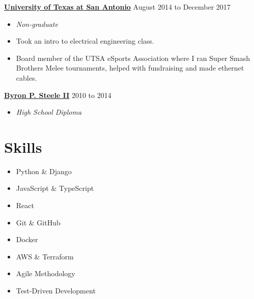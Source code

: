 \documentclass[10pt]{article}
\begin{document}
  \textbf{\href{https://www.utsa.edu/}{University of Texas at San Antonio}} \hfill {August 2014 to December 2017}
   \begin{itemize}
     \item[] \textit{Non-graduate}
     \item[] Took an intro to electrical engineering class.
     \item[] Board member of the UTSA eSports Association where I ran Super Smash Brothers Melee tournaments, helped with fundraising and made ethernet cables.
   \end{itemize}

  \textbf{\href{https://www.scuc.txed.net/ByronSteele}{Byron P. Steele II}} \hfill {2010 to 2014}
   \begin{itemize}
     \item[] \textit{High School Diploma}
   \end{itemize}

  \section*{Skills}

   \begin{multicols}{2}
   \begin{itemize}
        \item[] Python \& Django
        \item[] JavaScript \& TypeScript
        \item[] React
        \item[] Git \& GitHub
        \item[] Docker
        \item[] AWS \& Terraform
        \item[] Agile Methodology
        \item[] Test-Driven Development
   \end{itemize}
   \end{multicols}
\end{document}
